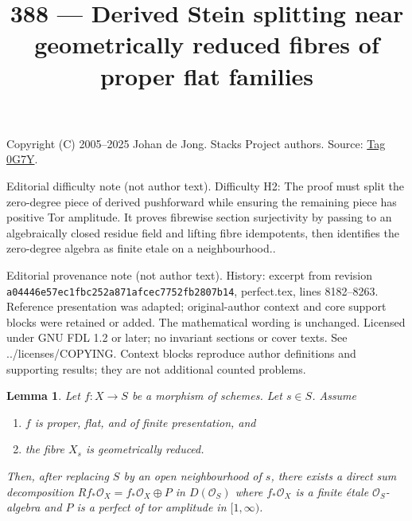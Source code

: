 \documentclass{amsart}
\theoremstyle{plain}
\newtheorem{lemma}[subsection]{Lemma}
\theoremstyle{definition}
\theoremstyle{remark}
\numberwithin{equation}{subsection}
\begin{document}
\title[Stacks Project, Tag 0G7Y]{388 --- Derived Stein splitting near geometrically reduced fibres of proper flat families}
\maketitle
\noindent Copyright (C) 2005--2025 Johan de Jong. Stacks Project authors. Source: \href{https://stacks.math.columbia.edu/tag/0G7Y}{Tag 0G7Y}.

\noindent Editorial difficulty note (not author text). Difficulty H2: The proof must split the zero-degree piece of derived pushforward while ensuring the remaining piece has positive Tor amplitude. It proves fibrewise section surjectivity by passing to an algebraically closed residue field and lifting fibre idempotents, then identifies the zero-degree algebra as finite etale on a neighbourhood..

\noindent Editorial provenance note (not author text). History: excerpt from revision \texttt{a0444\allowbreak 6e57e\allowbreak c1fbc\allowbreak 252a8\allowbreak 71afc\allowbreak ec775\allowbreak 2fb28\allowbreak 07b14}, perfect.tex, lines 8182--8263. Reference presentation was adapted; original-author context and core support blocks were retained or added. The mathematical wording is unchanged. Licensed under GNU FDL 1.2 or later; no invariant sections or cover texts. See ../licenses/COPYING. Context blocks reproduce author definitions and supporting results; they are not additional counted problems.

\begin{lemma}
\label{lemma-proper-flat-geom-red}
Let $f : X \to S$ be a morphism of schemes. Let $s \in S$. Assume
\begin{enumerate}
\item $f$ is proper, flat, and of finite presentation, and
\item the fibre $X_s$ is geometrically reduced.
\end{enumerate}
Then, after replacing $S$ by an open neighbourhood of $s$, there
exists a direct sum decomposition
$Rf_*\mathcal{O}_X = f_*\mathcal{O}_X \oplus P$
in $D(\mathcal{O}_S)$ where $f_*\mathcal{O}_X$ is a finite \'etale
$\mathcal{O}_S$-algebra and
$P$ is a perfect of tor amplitude in $[1, \infty)$.
\end{lemma}
\end{document}
